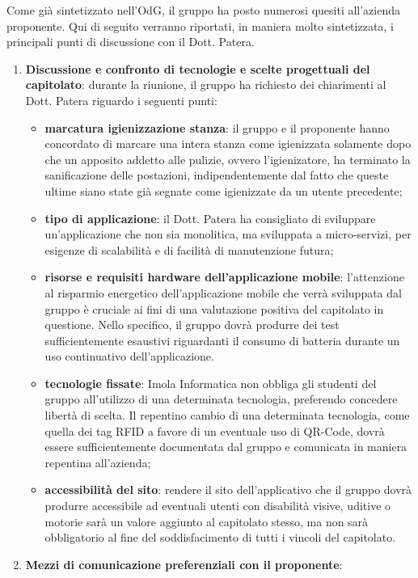 Come già sintetizzato nell'OdG, il gruppo \Gruppo{} ha posto numerosi quesiti all'azienda proponente. Qui di seguito verranno riportati, in maniera molto sintetizzata, i principali punti di discussione con il Dott. Patera.
\begin{enumerate}
	\item \textbf{Discussione e confronto di tecnologie e scelte progettuali del capitolato}: durante la riunione, il gruppo ha richiesto dei chiarimenti al Dott. Patera riguardo i seguenti punti:
	\begin{itemize}
		\item \textbf{marcatura igienizzazione stanza}: il gruppo e il proponente hanno concordato di marcare una intera stanza come igienizzata solamente dopo che un apposito addetto alle pulizie, ovvero l'igienizatore, ha terminato la sanificazione delle postazioni, indipendentemente dal fatto che queste ultime siano state già segnate come igienizzate da un utente precedente;
		\item \textbf{tipo di applicazione}: il Dott. Patera ha consigliato di sviluppare un'applicazione che non sia monolitica, ma sviluppata a micro-servizi, per esigenze di scalabilità e di facilità di manutenzione futura;
		\item \textbf{risorse e requisiti hardware dell'applicazione mobile}: l'attenzione al risparmio energetico dell'applicazione mobile che verrà sviluppata dal gruppo \Gruppo{} è cruciale ai fini di una valutazione positiva del capitolato in questione. Nello specifico, il gruppo dovrà produrre dei test sufficientemente esaustivi riguardanti il consumo di batteria durante un uso continuativo dell'applicazione.
		\item \textbf{tecnologie fissate}: Imola Informatica non obbliga gli studenti del gruppo \Gruppo{} all'utilizzo di una determinata tecnologia, preferendo concedere libertà di scelta. Il repentino cambio di una determinata tecnologia, come quella dei tag RFID a favore di un eventuale uso di QR-Code, dovrà essere sufficientemente documentata dal gruppo e comunicata in maniera repentina all'azienda;
		\item \textbf{accessibilità del sito}: rendere il sito dell'applicativo che il gruppo \Gruppo{} dovrà produrre accessibile ad eventuali utenti con disabilità visive, uditive o motorie sarà un valore aggiunto al capitolato stesso, ma non sarà obbligatorio al fine del soddisfacimento di tutti i vincoli del capitolato.
	\end{itemize}
	\item \textbf{Mezzi di comunicazione preferenziali con il proponente}:

\end{enumerate}
